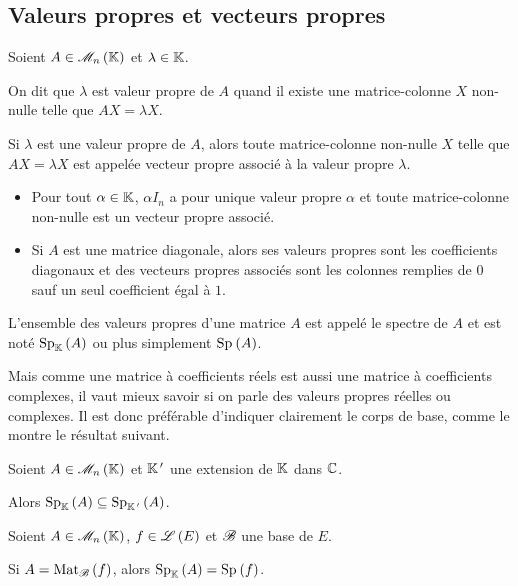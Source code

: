 \subsection{Valeurs propres et vecteurs propres}

\begin{defi}
Soient \(A\in\M{n}\) et \(\lambda\in\mathbb{K}\).

On dit que \(\lambda\) est valeur propre de \(A\) quand il existe une matrice-colonne \(X\) non-nulle telle que \(AX=\lambda X\).

Si \(\lambda\) est une valeur propre de \(A\), alors toute matrice-colonne non-nulle \(X\) telle que \(AX=\lambda X\) est appelée vecteur propre associé à la valeur propre \(\lambda\).
\end{defi}

\begin{ex}
\begin{itemize}
    \item Pour tout \(\alpha\in\mathbb{K}\), \(\alpha I_n\) a pour unique valeur propre \(\alpha\) et toute matrice-colonne non-nulle est un vecteur propre associé. \\
    \item Si \(A\) est une matrice diagonale, alors ses valeurs propres sont les coefficients diagonaux et des vecteurs propres associés sont les colonnes remplies de \(0\) sauf un seul coefficient égal à \(1\).
\end{itemize}
\end{ex}

L'ensemble des valeurs propres d'une matrice \(A\) est appelé le spectre de \(A\) et est noté \(\Sp[\K]{A}\) ou plus simplement \(\Sp{A}\).

Mais comme une matrice à coefficients réels est aussi une matrice à coefficients complexes, il vaut mieux savoir si on parle des valeurs propres réelles ou complexes. Il est donc préférable d'indiquer clairement le corps de base, comme le montre le résultat suivant.

\begin{prop}
Soient \(A\in\M{n}\) et \(\mathbb{K}^{\,\prime}\) une extension de \(\mathbb{K}\) dans \(\mathbb{C}\).

Alors \(\Sp[\K]{A}\subset\Sp[\K\prim]{A}\).
\end{prop}

\begin{prop}
Soient \(A\in\M{n}\), \(f\in\mathscr{L}\left(E\right)\) et \(\mathscr{B}\) une base de \(E\).

Si \(A=\Mat{f}\), alors \(\Sp[\K]{A}=\Sp{f}\).
\end{prop}

